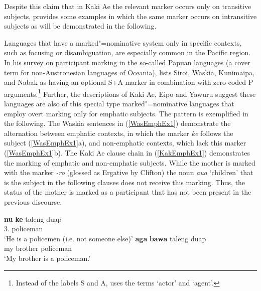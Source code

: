Despite this claim that in Kaki Ae the relevant marker occurs only on transitive subjects, \citet{Clifton:1997} provides some examples in which the same marker occurs on intransitive subjects as will be demonstrated in the following.

Languages that have a marked"=nominative system only in specific contexts, such as focusing or disambiguation, are especially common in the Pacific region.
In his survey on participant marking in the so-called Papuan languages (a cover term for non-Austronesian languages of Oceania),\citet{Whitehead:1981} lists Siroi, Waskia, Kunimaipa, and Nabak as having an optional S+A marker in combination with zero-coded P arguments.\footnote{Instead of the labels S and A, \citet{Whitehead:1981} uses the terms `actor' and `agent'.} 
Further, the descriptions  of Kaki Ae, Eipo and Yawuru  suggest these languages are also of this special type marked"=nominative languages that employ overt marking only for emphatic subjects.
The pattern is exemplified in the following. 
The Waskia sentences in (\ref{WasEmphEx1}) demonstrate the alternation between emphatic contexts, in which the marker \emph{ke} follows the subject (\ref{WasEmphEx1}a), and non-emphatic contexts, which lack this marker (\ref{WasEmphEx1}b). 
The Kaki Ae clause chain in (\ref{KakEmphEx1}) demonstrates the marking of emphatic and non-emphatic subjects. 
While the mother is marked with the marker \emph{-ro} (glossed as Ergative by Clifton) the noun \emph{aua} `children' that is the subject in the following clauses does not receive this marking. 
Thus, the status of the mother is marked as a participant that has not been present in the previous discourse.
 
\begin{exe}\ex\label{WasEmphEx1}
\begin{xlist}
\ex\gll \textbf{nu} \textbf{ke} {taleng duap}\\
3\sg{}.\pronoun{} \nom{} policeman\\
\glt `He is a policemen (i.e. not someone else)'
\ex\gll \textbf{aga} \textbf{bawa} {taleng duap}\\
my brother policeman\\
\glt `My brother is a policeman.'
\end{xlist}
\end{exe}


